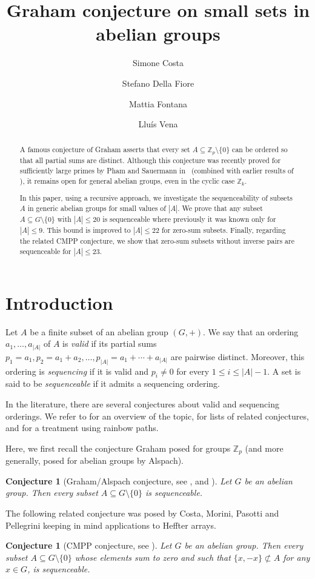 \documentclass[11pt]{amsart}
\title{Graham conjecture on small sets in abelian groups}
\author[]{Simone Costa}
\author[]{Stefano Della Fiore}
\author[]{Mattia Fontana}
\author[]{Lluís Vena}
\newtheorem{conjecture}[theorem]{Conjecture}
\theoremstyle{definition}
\begin{document}
\begin{abstract}
A famous conjecture of Graham asserts that every set $A \subseteq \mathbb{Z}_p \setminus \{0\}$ can be ordered so that all partial sums are distinct.
Although this conjecture was recently proved for sufficiently large primes by Pham and Sauermann in~\cite{PM} (combined with earlier results of \cite{BBKMM}), it remains open for general abelian groups, even in the cyclic case $\mathbb{Z}_k$.

In this paper, using a recursive approach, we investigate the sequenceability of subsets $A$ in generic abelian groups for small values of $|A|$. We prove that any subset $A \subseteq G\setminus\{0\}$ with $|A| \leq 20$ is sequenceable where previously it was known only for $|A|\leq 9$. This bound is improved to $|A| \leq 22$ for zero-sum subsets. Finally, regarding the related CMPP conjecture, we show that zero-sum subsets without inverse pairs are sequenceable for $|A| \leq 23$.
\end{abstract}
\maketitle

\section{Introduction}
Let $A$ be a finite subset of an abelian group $(G,+)$. We say that an ordering
$a_1, \ldots, a_{|A|}$ of $A$ is \emph{valid} if its partial sums
$p_1=a_1, p_2=a_1+a_2, \ldots, p_{|A|}=a_1 + \cdots + a_{|A|}$ are pairwise distinct.
Moreover, this ordering is \emph{sequencing} if it is valid and $p_i \neq 0$
for every $1 \le i \le |A|-1$. A set is said to be \emph{sequenceable} if it admits a sequencing ordering.

In the literature, there are several conjectures about valid  and sequencing orderings.
We refer to \cite{CMPP18, OllisSurvey, PD} for an overview of the topic,
\cite{AKP, AL20, ADMS16, CDOR} for lists of related conjectures,
and \cite{BFMPY} for a treatment using rainbow paths.

Here, we first recall the conjecture Graham posed for groups $\mathbb{Z}_p$ (and more generally, posed for abelian groups by Alspach).

\begin{conjecture}[Graham/Alspach conjecture, see \cite{GR}, \cite{EG} and \cite{AL20}]\label{conj:main}
Let $G$ be an abelian group. Then every subset $A \subseteq G \setminus\{0\}$ is sequenceable.
\end{conjecture}
The following related conjecture was posed by Costa, Morini, Pasotti and Pellegrini keeping in mind applications to Heffter arrays.
\begin{conjecture}[CMPP conjecture, see \cite{CMPP18}]\label{conj:main2}
Let $G$ be an abelian group. Then every subset $A \subseteq G \setminus\{0\}$ whose elements sum to zero and such that $\{x,-x\}\not\subset A$ for any $x\in G$, is sequenceable.
\end{conjecture}
\end{document}
